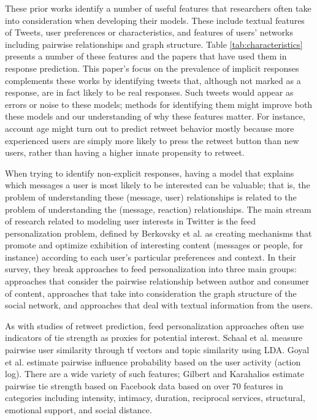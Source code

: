These prior works identify a number of useful features that researchers often take into consideration when developing their models.  These include textual features of Tweets, user preferences or characteristics, and features of users' networks including pairwise relationships and graph structure.  Table \ref{tab:characteristics} presents a number of these features and the papers that have used them in response prediction.  This paper's focus on the prevalence of implicit responses complements these works by identifying tweets that, although not marked as a response, are in fact likely to be real responses.  Such tweets would appear as errors or noise to these models; methods for identifying them might improve both these models and our understanding of why these features matter. For instance, account age might turn out to predict retweet behavior mostly because more experienced users are simply more likely to press the retweet button than new users, rather than having a higher innate propensity to retweet.

When trying to identify non-explicit responses, having a model that explains which messages a user is most likely to be interested can be valuable; that is, the problem of understanding these (message, user) relationships is related to the problem of understanding the (message, reaction) relationships.  
The main stream of research related to modeling user interests in Twitter is the feed personalization problem, defined by Berkovsky et al. \cite{Berkovsky2015} as creating mechanisms that promote and optimize exhibition of interesting content (messages or people, for instance) according to each user's particular preferences and context.  
In their survey, they break approaches to feed personalization into three main groups: approaches that consider the pairwise relationship between author and consumer of content, approaches that take into consideration the graph structure of the social network, and approaches that deal with textual information from the users.

As with studies of retweet prediction, feed personalization approaches often use indicators of tie strength as proxies for potential interest.  
Schaal et al. \cite{Schaal2012} measure pairwise user similarity through tf vectors and topic similarity using LDA. 
Goyal et al. \cite{Goyal2010} estimate pairwise influence probability based on the user activity (action log).  There are a wide variety of such features; Gilbert and Karahalios \cite{Gilbert2009} estimate pairwise tie strength based on Facebook data based on over 70 features in categories including intensity, intimacy, duration, reciprocal services, structural, emotional support, and social distance.  

